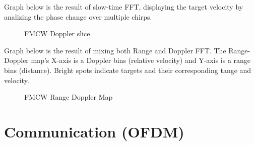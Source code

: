 \documentclass[conference]{IEEEtran}
\begin{document}
\begin{enumerate}
Graph below is the result of slow-time FFT, displaying the target velocity by analizing the phase change over multiple chirps. 

	\begin{figure}[H]
	    		\centering
	    		\caption{FMCW Doppler slice}
		\end{figure}
	
Graph below is the result of mixing both Range and Doppler FFT. The Range-Doppler map's X-axis is a Doppler bins (relative velocity) and Y-axis is a range bins (distance). Bright spots indicate targets and their corresponding tange and velocity.
	\begin{figure}[H]
	    		\centering
	    		\caption{FMCW Range Doppler Map}
		\end{figure}
		
		
     \section {Communication (OFDM)}
     

\end{enumerate}
\end{document}
